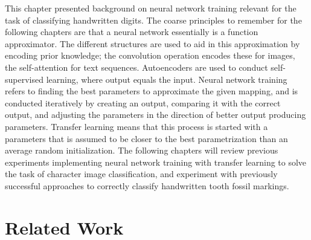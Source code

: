 \documentclass[english,twoside,openright]{UH_DS_MSc}
\begin{document}
This chapter presented background on neural network training relevant for the task 
of classifying handwritten digits. The coarse principles to remember for the following chapters 
are that a neural network essentially is a function approximator. The different structures are 
used to aid in this approximation by encoding prior knowledge; the convolution operation encodes these 
for images, the self-attention for text sequences. Autoencoders are used to conduct self-supervised
learning, where output equals the input. Neural network training refers to finding the best 
parameters to approximate the given mapping, and is conducted iteratively by creating 
an output, comparing it with the correct output, and adjusting the parameters in the direction 
of better output producing parameters. Transfer learning means that this process is started with a 
 parameters that is assumed to be closer to the best parametrization than an average 
random initialization. The following chapters will review previous experiments implementing 
neural network training with transfer learning to solve the task of character image classification, and experiment with previously successful approaches to correctly classify handwritten tooth fossil markings.

\chapter{Related Work}

\end{document}
